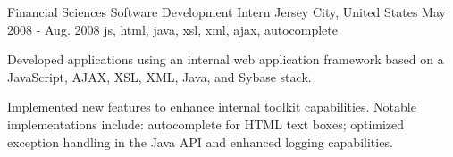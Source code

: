 \cventry
    {Financial Sciences} %
    {Software Development Intern} %
    {Jersey City, United States} %
    {May 2008 - Aug. 2008} %
    { js, html, java, xsl, xml, ajax, autocomplete }
    {
    \begin{cvitems} %
        \item {Developed applications using an internal web application framework based on a JavaScript, AJAX, XSL, XML, Java, and Sybase stack.}
        \item {Implemented new features to enhance internal toolkit capabilities. Notable implementations include: autocomplete for HTML text boxes; optimized exception handling in the Java API and enhanced logging capabilities.}
    \end{cvitems}
    }